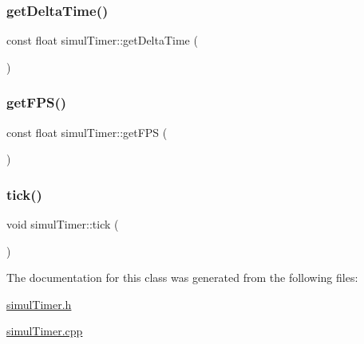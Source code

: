 \subsubsection{\texorpdfstring{get\+Delta\+Time()}{getDeltaTime()}}
{\footnotesize\ttfamily const float simul\+Timer\+::get\+Delta\+Time (\begin{DoxyParamCaption}{ }\end{DoxyParamCaption})}

\mbox{\label{classsimulTimer_a2f2d57b92ae047ab2aa2038160bec66a}} 
\subsubsection{\texorpdfstring{get\+F\+P\+S()}{getFPS()}}
{\footnotesize\ttfamily const float simul\+Timer\+::get\+F\+PS (\begin{DoxyParamCaption}{ }\end{DoxyParamCaption})}

\mbox{\label{classsimulTimer_a18ac8cf05d58ec73a14f8b0e65ac4170}} 
\subsubsection{\texorpdfstring{tick()}{tick()}}
{\footnotesize\ttfamily void simul\+Timer\+::tick (\begin{DoxyParamCaption}{ }\end{DoxyParamCaption})}



The documentation for this class was generated from the following files\+:\begin{DoxyCompactItemize}
\item 
\hyperlink{simulTimer_8h}{simul\+Timer.\+h}\item 
\hyperlink{simulTimer_8cpp}{simul\+Timer.\+cpp}\end{DoxyCompactItemize}
